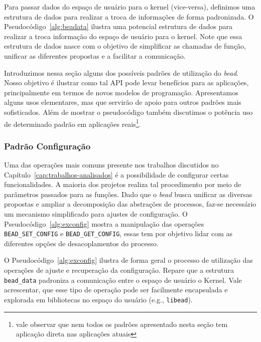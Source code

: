 

Para passar dados do espaço de usuário para o kernel (vice-versa), definimos
uma estrutura de dados para realizar a troca de informações de forma
padronizada. O Pseudocódigo~\ref{alg:beadata} ilustra uma potencial estrutura
de dados para realizar a troca informação do espaço de usuário para o kernel.
Note que essa estrutura de dados nasce com o objetivo de simplificar as
chamadas de função, unificar as diferentes propostas e a facilitar a
comunicação.



Introduzimos nessa seção alguns dos possíveis padrões de utilização do
\emph{bead}. Nosso objetivo é ilustrar como tal API pode levar benefícios para
as aplicações, principalmente em termos de novos modelos de programação.
Apresentamos alguns usos elementares, mas que servirão de apoio para outros
padrões mais sofisticados. Além de mostrar o pseudocódigo também discutimos o
potência uso de determinado padrão em aplicações reais\footnote{vale observar
que nem todos os padrões apresentado nesta seção tem aplicação direta nas
aplicações atuais}.

\subsubsection{Padrão Configuração}

Uma das operações mais comuns presente nos trabalhos discutidos no
Capítulo~\ref{cap:trabalhos-analisados} é a possibilidade de configurar certas
funcionalidades. A maioria dos projetos realiza tal procedimento por meio de
parâmetros passados para as funções. Dado que o \emph{bead} busca unificar as
diversas propostas e ampliar a decomposição das abstrações de processos, faz-se
necessário um mecanismo simplificado para ajustes de configuração. O
Pseudocódigo~\ref{alg:exconfig} mostra a manipulação das operações
\texttt{BEAD\_SET\_CONFIG} e \texttt{BEAD\_GET\_CONFIG}, essas tem por objetivo
lidar com as diferentes opções de desacoplamentos do processo.



O Pseudocódigo~\ref{alg:exconfig} ilustra de forma geral o processo de
utilização das operações de ajuste e recuperação da configuração. Repare que a
estrutura \texttt{bead\_data} padroniza a comunicação entre o espaço de usuário
o Kernel. Vale acrescentar, que esse tipo de operação pode ser facilmente
encapsulada e explorada em bibliotecas no espaço do usuário (e.g.,
\texttt{libead}).

